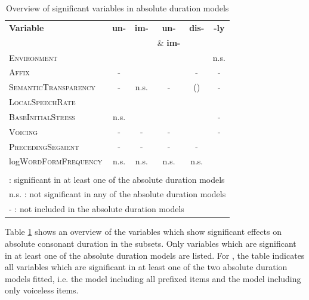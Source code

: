 \begin{table}[b!]
	\caption{Overview of significant variables in absolute duration models}
	\label{tbl: Overview of results in the corpus study}
	\centering
	
		\begin{tabular} {lccccc}
			
			
			\textbf{Variable} & \textbf{un-} & \textbf{im-} &\textbf{un-} &\textbf{dis-}& \textbf{-ly}\\
			& & &\& \textbf{im-}  && \\
			\midrule			
			\textsc{Environment}& \checkmark & \checkmark  & \checkmark & \checkmark & n.s. \\ 
			\textsc{Affix }&- &\checkmark  & \checkmark  &- & -\\ 
			
			\textsc{SemanticTransparency}&-& n.s. &  - & (\checkmark) & - \\
			\textsc{LocalSpeechRate}&\checkmark & \checkmark & \checkmark  &\checkmark  & \checkmark \\			
			\textsc{BaseInitialStress}&n.s.& \checkmark & \checkmark & \checkmark &-\\
			\textsc{Voicing}& - & - & - &\checkmark  & - \\
			\textsc{PrecedingSegment}&-& -& - & - &\checkmark\\
			log\textsc{WordFormFrequency}&n.s.& n.s.& n.s. & n.s.&\checkmark\\
			
			\midrule\\
			
			\multicolumn{6}{l}{\small \checkmark \hspace*{0.2cm}: significant in at least one of the absolute duration models} \\			
			\multicolumn{6}{l}{\small n.s. : not significant in any of the absolute duration models} \\			
			\multicolumn{6}{l}{\small - \hspace*{0.45cm}: not included in the absolute duration models} \\			
			
		\end{tabular}
	
	
	
	\vspace*{-0.7cm}
\end{table}


Table \ref{tbl: Overview of results in the corpus study} shows an overview of the variables which show significant effects on absolute consonant duration in the subsets. Only variables which are significant in at least one of the absolute duration models are listed. For , the table indicates all variables which are significant in at least one of the two absolute duration models fitted, i.e. the model including all prefixed items and the model including only voiceless items.







